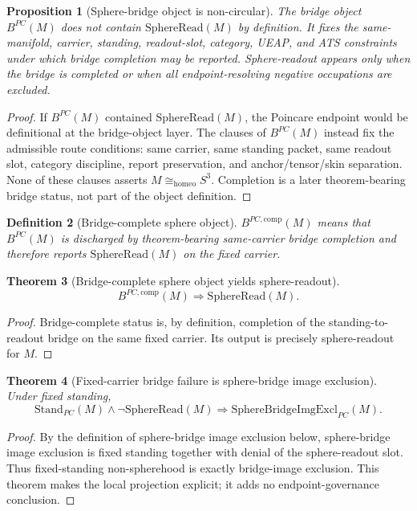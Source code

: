 \documentclass[11pt]{article}
\newtheorem{theorem}{Theorem}[section]
\newtheorem{proposition}[theorem]{Proposition}
\newtheorem{definition}[theorem]{Definition}
\newcommand{\Sthree}{S^{3}}
\newcommand{\StandPC}{\mathrm{Stand}_{PC}}
\newcommand{\SphereRead}{\mathrm{SphereRead}}
\newcommand{\SphereBridgeImgExcl}{\mathrm{SphereBridgeImgExcl}_{PC}}
\newcommand{\BridgeObjPC}{B^{PC}}
\newcommand{\BridgeObjCompPC}{B^{PC,\mathrm{comp}}}
\newcommand{\Homeo}{\cong_{\mathrm{homeo}}}
\begin{document}
\begin{proposition}[Sphere-bridge object is non-circular]\label{prop:bridge-object-noncircular}
The bridge object \(\BridgeObjPC(M)\) does not contain \(\SphereRead(M)\) by definition. It fixes the same-manifold, carrier, standing, readout-slot, category, UEAP, and ATS constraints under which bridge completion may be reported. Sphere-readout appears only when the bridge is completed or when all endpoint-resolving negative occupations are excluded.
\end{proposition}
\begin{proof}
If \(\BridgeObjPC(M)\) contained \(\SphereRead(M)\), the Poincare endpoint would be definitional at the bridge-object layer. The clauses of \(\BridgeObjPC(M)\) instead fix the admissible route conditions: same carrier, same standing packet, same readout slot, category discipline, report preservation, and anchor/tensor/skin separation. None of these clauses asserts \(M\Homeo\Sthree\). Completion is a later theorem-bearing bridge status, not part of the object definition.
\end{proof}

\begin{definition}[Bridge-complete sphere object]
\(\BridgeObjCompPC(M)\) means that \(\BridgeObjPC(M)\) is discharged by theorem-bearing same-carrier bridge completion and therefore reports \(\SphereRead(M)\) on the fixed carrier.
\end{definition}

\begin{theorem}[Bridge-complete sphere object yields sphere-readout]\label{thm:bridge-complete-sphere-readout}
\[
\BridgeObjCompPC(M)\Rightarrow \SphereRead(M).
\]
\end{theorem}
\begin{proof}
Bridge-complete status is, by definition, completion of the standing-to-readout bridge on the same fixed carrier. Its output is precisely sphere-readout for \(M\).
\end{proof}

\begin{theorem}[Fixed-carrier bridge failure is sphere-bridge image exclusion]\label{thm:fixed-bridge-failure-exclusion}
Under fixed standing,
\[
\StandPC(M)\wedge\neg\SphereRead(M)\Rightarrow \SphereBridgeImgExcl(M).
\]
\end{theorem}
\begin{proof}
By the definition of sphere-bridge image exclusion below, sphere-bridge image exclusion is fixed standing together with denial of the sphere-readout slot. Thus fixed-standing non-spherehood is exactly bridge-image exclusion. This theorem makes the local projection explicit; it adds no endpoint-governance conclusion.
\end{proof}
\end{document}
